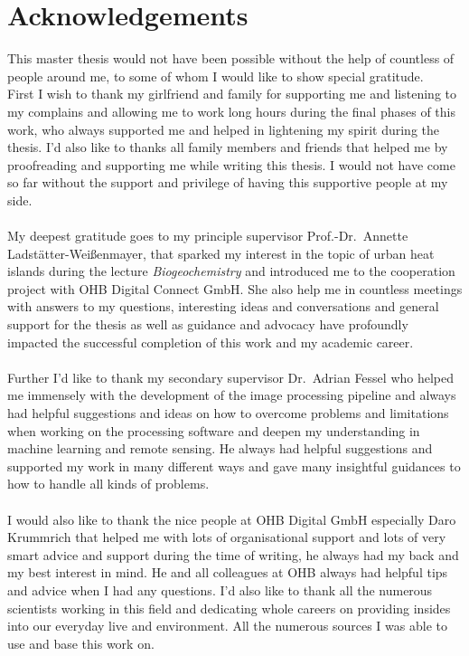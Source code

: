 \section*{Acknowledgements}
This master thesis would not have been possible without the help of countless of people around me, to some of whom I would like to show special gratitude. \\
%
First I wish to thank my girlfriend and family for supporting me and listening to my complains and allowing me to work long hours during the final phases of this work, who always supported me and helped in lightening my spirit during the thesis. 
I'd also like to thanks all family members and friends that helped me by proofreading and supporting me while writing this thesis.
I would not have come so far without the support and privilege of having this supportive people at my side.\\ \\
%
My deepest gratitude goes to my principle supervisor Prof.-Dr.~Annette Ladstätter-Weißenmayer, that sparked my interest in the topic of urban heat islands during the lecture \textit{Biogeochemistry} and introduced me to the cooperation project with OHB Digital Connect GmbH. 
She also help me in countless meetings with answers to my questions, interesting ideas and conversations and general support for the thesis as well as guidance and advocacy have profoundly impacted the successful completion of this work and my academic career.\\ \\
%
Further I'd like to thank my secondary supervisor Dr.\ Adrian Fessel who helped me immensely with the development of the image processing pipeline and always had helpful suggestions and ideas on how to overcome problems and limitations when working on the processing software and deepen my understanding in machine learning and remote sensing. 
He always had helpful suggestions and supported my work in many different ways and gave many insightful guidances to how to handle all kinds of problems.\\ \\
%
I would also like to thank the nice people at OHB Digital GmbH especially Daro Krummrich that helped me with lots of organisational support and lots of very smart advice and support during the time of writing, he always had my back and my best interest in mind. He and all colleagues at OHB always had helpful tips and advice when I had any questions.
%
I'd also like to thank all the numerous scientists working in this field and dedicating whole careers on providing insides into our everyday live and environment. All the numerous sources I was able to use and base this work on. 
\newpage
